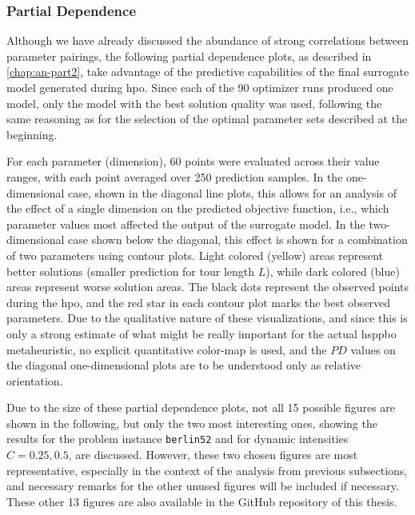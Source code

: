 \subsubsection{Partial Dependence}

Although we have already discussed the abundance of strong correlations between parameter pairings, the following partial dependence plots, as described in \cref{chap:an-part2}, take advantage of the predictive capabilities of the final surrogate model generated during \gls{hpo}. Since each of the 90 optimizer runs produced one model, only the model with the best solution quality was used, following the same reasoning as for the selection of the optimal parameter sets described at the beginning.

For each parameter (dimension), 60 points were evaluated across their value ranges, with each point averaged over 250 prediction samples. In the one-dimensional case, shown in the diagonal line plots, this allows for an analysis of the effect of a single dimension on the predicted objective function, i.e., which parameter values most affected the output of the surrogate model. In the two-dimensional case shown below the diagonal, this effect is shown for a combination of two parameters using contour plots. Light colored (yellow) areas represent better solutions (smaller prediction for tour length $L$), while dark colored (blue) areas represent worse solution areas. The black dots represent the observed points during the \gls{hpo}, and the red star in each contour plot marks the best observed parameters. Due to the qualitative nature of these visualizations, and since this is only a strong estimate of what might be really important for the actual \gls{hsppbo} metaheuristic, no explicit quantitative color-map is used, and the $PD$ values on the diagonal one-dimensional plots are to be understood only as relative orientation.

Due to the size of these partial dependence plots, not all 15 possible figures are shown in the following, but only the two most interesting ones, showing the results for the problem instance \texttt{berlin52} and for dynamic intensities $C={0.25,0.5}$, are discussed. However, these two chosen figures are most representative, especially in the context of the analysis from previous subsections, and necessary remarks for the other unused figures will be included if necessary. These other 13 figures are also available in the GitHub repository of this thesis.

